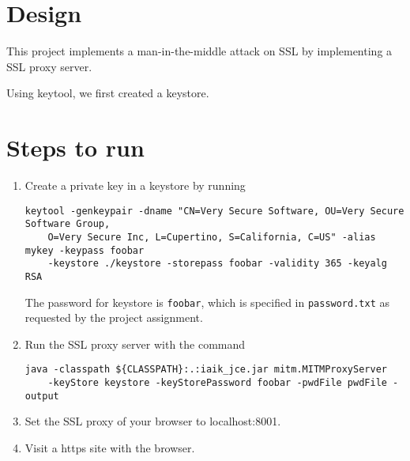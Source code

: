 
\usepackage{graphicx,amssymb,amsmath,enumerate}
\usepackage{courier}
\usepackage{color}
\usepackage{listings}
\usepackage{fancyvrb}
\usepackage{stmaryrd}

\oddsidemargin 0in
\evensidemargin 0in
\textwidth 6.5in
\topmargin -0.5in
\textheight 9.0in




\pagestyle{myheadings}  %

\section{Design}

This project implements a man-in-the-middle attack on SSL by implementing a SSL proxy server.

Using keytool, we first created a keystore. 
\section{Steps to run}
\begin{enumerate}[1.]
  \item Create a private key in a keystore by running 

\begin{lstlisting} 
keytool -genkeypair -dname "CN=Very Secure Software, OU=Very Secure Software Group, 
    O=Very Secure Inc, L=Cupertino, S=California, C=US" -alias mykey -keypass foobar 
    -keystore ./keystore -storepass foobar -validity 365 -keyalg RSA
\end{lstlisting}

  The password for keystore is \texttt{foobar}, which is specified in \texttt{password.txt} as requested by the project assignment.

\item Run the SSL proxy server with the command 
\begin{lstlisting}
java -classpath ${CLASSPATH}:.:iaik_jce.jar mitm.MITMProxyServer 
    -keyStore keystore -keyStorePassword foobar -pwdFile pwdFile -output
\end{lstlisting}

\item Set the SSL proxy of your browser to localhost:8001.
\item Visit a https site with the browser.
\end{enumerate}

